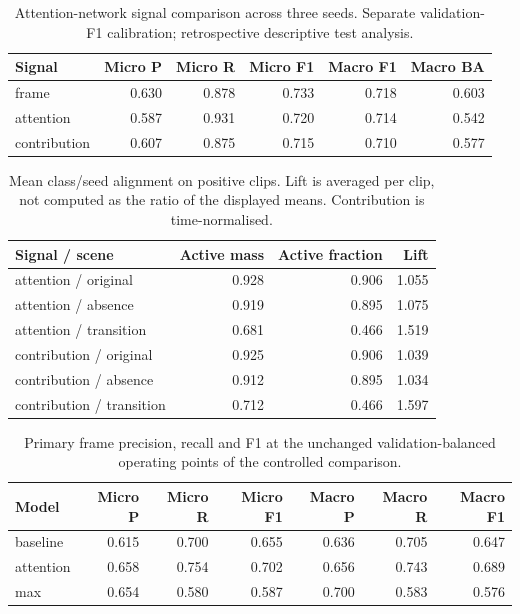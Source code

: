 \begin{table}[H]\centering\small
\caption{Attention-network signal comparison across three seeds. Separate validation-F1 calibration; retrospective descriptive test analysis.}
\begin{tabular}{lrrrrr}\toprule
Signal & Micro P & Micro R & Micro F1 & Macro F1 & Macro BA \\\midrule
frame & 0.630 & 0.878 & 0.733 & 0.718 & 0.603 \\
attention & 0.587 & 0.931 & 0.720 & 0.714 & 0.542 \\
contribution & 0.607 & 0.875 & 0.715 & 0.710 & 0.577 \\
\bottomrule\end{tabular}\end{table}
\begin{table}[H]\centering\small
\caption{Mean class/seed alignment on positive clips. Lift is averaged per clip, not computed as the ratio of the displayed means. Contribution is time-normalised.}
\begin{tabular}{lrrr}\toprule
Signal / scene & Active mass & Active fraction & Lift \\\midrule
attention / original & 0.928 & 0.906 & 1.055 \\
attention / absence & 0.919 & 0.895 & 1.075 \\
attention / transition & 0.681 & 0.466 & 1.519 \\
contribution / original & 0.925 & 0.906 & 1.039 \\
contribution / absence & 0.912 & 0.895 & 1.034 \\
contribution / transition & 0.712 & 0.466 & 1.597 \\
\bottomrule\end{tabular}\end{table}
\begin{table}[H]\centering\small
\caption{Primary frame precision, recall and F1 at the unchanged validation-balanced operating points of the controlled comparison.}
\begin{tabular}{lrrrrrr}\toprule
Model & Micro P & Micro R & Micro F1 & Macro P & Macro R & Macro F1 \\\midrule
baseline & 0.615 & 0.700 & 0.655 & 0.636 & 0.705 & 0.647 \\
attention & 0.658 & 0.754 & 0.702 & 0.656 & 0.743 & 0.689 \\
max & 0.654 & 0.580 & 0.587 & 0.700 & 0.583 & 0.576 \\
\bottomrule\end{tabular}\end{table}